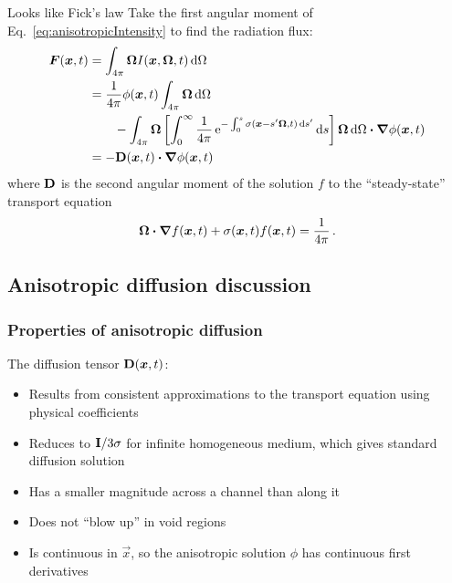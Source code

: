 \documentclass{beamer}
\newcommand{\Dtens}{\mat{D}}
\begin{document}
\begin{frame}{Looks like Fick's law}
  Take the first angular moment of Eq.~\eqref{eq:anisotropicIntensity} to find
  the radiation flux:
\begin{align*}
  \vec{F}(\vec{x}, t) &= \int_{4\pi} \vec{\Omega} I(\vec{x}, \vec{\Omega}, t) \ud \Omega
  \\
  &=
  \frac{1}{4\pi}\phi(\vec{x}, t) \int_{4\pi} \vec{\Omega} \ud \Omega
  \\
  &\qquad-  \int_{4\pi} \vec{\Omega} \left[ \int_{0}^{\infty} \frac{1}{4\pi}
  \eexp^{- \int_{0}^{s} \sigma(\vec{x}-s'\vec{\Omega}, t)
  \ud s'} \ud s\right]
\vec{\Omega}  \ud \Omega \vd \del \phi(\vec{x}, t)
\\
&= - \Dtens(\vec{x},t) \vd \del \phi(\vec{x}, t)
\end{align*}
where $\Dtens$ is the second angular moment of the solution $f$ to the
``steady-state'' transport equation
\begin{equation} \label{eq:dcoeffTransportEquation}
  \bm{\Omega}\bm{\cdot} \bm{\nabla} f(\bm{x},t) + \sigma(\bm{x},t) f(\bm{x},t) =
  \frac{1}{4\pi}\,.
\end{equation}
\end{frame}

\subsection{Anisotropic diffusion discussion}
\begin{frame}
  \frametitle{Properties of anisotropic diffusion}

  The diffusion tensor $\Dtens(\vec{x},t)$: 
  \begin{itemize}
    \item Results from consistent approximations to the transport equation
      using physical coefficients
    \item Reduces to $\mathbf{I}/3\sigma$ for infinite homogeneous
      medium, which gives standard diffusion solution
    \item Has a smaller magnitude across a channel than along it
    \item Does not ``blow up'' in void regions
    \item Is continuous in $\vec{x}$, so the anisotropic solution $\phi$
      has continuous first derivatives
  \end{itemize}
\end{frame}
\end{document}
